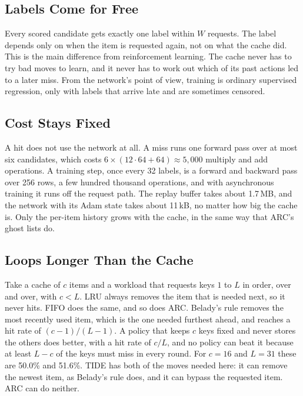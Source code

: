 \documentclass{llncs}
\begin{document}
\subsection{Labels Come for Free}

Every scored candidate gets exactly one label within $W$ requests. The label depends only on when the item is requested again, not on what the cache did. This is the main difference from reinforcement learning. The cache never has to try bad moves to learn, and it never has to work out which of its past actions led to a later miss. From the network's point of view, training is ordinary supervised regression, only with labels that arrive late and are sometimes censored.

\subsection{Cost Stays Fixed}

A hit does not use the network at all. A miss runs one forward pass over at most six candidates, which costs $6 \times (12 \cdot 64 + 64) \approx 5{,}000$ multiply and add operations. A training step, once every 32 labels, is a forward and backward pass over 256 rows, a few hundred thousand operations, and with asynchronous training it runs off the request path. The replay buffer takes about 1.7\,MB, and the network with its Adam state takes about 11\,kB, no matter how big the cache is. Only the per-item history grows with the cache, in the same way that ARC's ghost lists do.

\subsection{Loops Longer Than the Cache}
\label{sec:loops}

Take a cache of $c$ items and a workload that requests keys $1$ to $L$ in order, over and over, with $c < L$. LRU always removes the item that is needed next, so it never hits. FIFO does the same, and so does ARC. Belady's rule removes the most recently used item, which is the one needed furthest ahead, and reaches a hit rate of $(c-1)/(L-1)$. A policy that keeps $c$ keys fixed and never stores the others does better, with a hit rate of $c/L$, and no policy can beat it because at least $L - c$ of the keys must miss in every round. For $c = 16$ and $L = 31$ these are 50.0\% and 51.6\%. TIDE has both of the moves needed here: it can remove the newest item, as Belady's rule does, and it can bypass the requested item. ARC can do neither.
\end{document}

